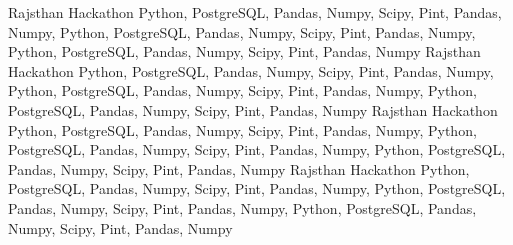 
\horizontalLineRight

\skillItem
    {Rajsthan Hackathon}
    {Python, PostgreSQL, Pandas, Numpy, Scipy, Pint,
        Pandas, Numpy, Python, PostgreSQL, Pandas, Numpy,
        Scipy, Pint,  Pandas, Numpy, Python, PostgreSQL, Pandas,
        Numpy, Scipy, Pint,  Pandas, Numpy}
\skillItem
    {Rajsthan Hackathon}
    {Python, PostgreSQL, Pandas, Numpy, Scipy, Pint,
        Pandas, Numpy, Python, PostgreSQL, Pandas, Numpy,
        Scipy, Pint,  Pandas, Numpy, Python, PostgreSQL, Pandas,
        Numpy, Scipy, Pint,  Pandas, Numpy}
\skillItem
    {Rajsthan Hackathon}
    {Python, PostgreSQL, Pandas, Numpy, Scipy, Pint,
        Pandas, Numpy, Python, PostgreSQL, Pandas, Numpy,
        Scipy, Pint,  Pandas, Numpy, Python, PostgreSQL, Pandas,
        Numpy, Scipy, Pint,  Pandas, Numpy}
\skillItem
    {Rajsthan Hackathon}
    {Python, PostgreSQL, Pandas, Numpy, Scipy, Pint,
        Pandas, Numpy, Python, PostgreSQL, Pandas, Numpy,
        Scipy, Pint,  Pandas, Numpy, Python, PostgreSQL, Pandas,
        Numpy, Scipy, Pint,  Pandas, Numpy}